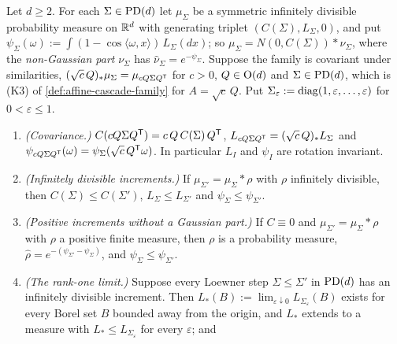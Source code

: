\begin{proposition}
\label{prop:similarity-general-sandwich}
\leanok
Let $d \ge 2$. For each $\Sigma \in \mathrm{PD}(d)$ let $\mu_\Sigma$ be a symmetric infinitely divisible
probability measure on $\mathbb{R}^d$ with generating triplet $(C(\Sigma), L_\Sigma, 0)$, and put
$\psi_\Sigma(\omega) := \int(1 - \cos\langle\omega,x\rangle)\,L_\Sigma(dx)$; so
$\mu_\Sigma = N(0,C(\Sigma)) * \nu_\Sigma$, where the \emph{non-Gaussian part} $\nu_\Sigma$ has
$\widehat\nu_\Sigma = e^{-\psi_\Sigma}$. Suppose the family is covariant under similarities,
$(\sqrt c\,Q)_*\mu_\Sigma = \mu_{cQ\Sigma Q^{\mathsf{T}}}$ for $c > 0$, $Q \in \mathrm{O}(d)$ and
$\Sigma \in \mathrm{PD}(d)$, which is (K3) of \ref{def:affine-cascade-family} for $A = \sqrt c\,Q$. Put
$\Sigma_\varepsilon := \operatorname{diag}(1,\varepsilon,\dots,\varepsilon)$ for $0 < \varepsilon \le 1$.
\begin{enumerate}
\item \emph{(Covariance.)} $C(cQ\Sigma Q^{\mathsf{T}}) = c\,Q\,C(\Sigma)\,Q^{\mathsf{T}}$,
$L_{cQ\Sigma Q^{\mathsf{T}}} = (\sqrt c\,Q)_*L_\Sigma$ and
$\psi_{cQ\Sigma Q^{\mathsf{T}}}(\omega) = \psi_\Sigma(\sqrt c\,Q^{\mathsf{T}}\omega)$. In particular $L_I$ and
$\psi_I$ are rotation invariant.
\item \emph{(Infinitely divisible increments.)} If $\mu_{\Sigma'} = \mu_\Sigma * \rho$ with $\rho$
infinitely divisible, then $C(\Sigma) \le C(\Sigma')$, $L_\Sigma \le L_{\Sigma'}$ and
$\psi_\Sigma \le \psi_{\Sigma'}$.
\item \emph{(Positive increments without a Gaussian part.)} If $C \equiv 0$ and
$\mu_{\Sigma'} = \mu_\Sigma * \rho$ with $\rho$ a positive finite measure, then $\rho$ is a
probability measure, $\widehat\rho = e^{-(\psi_{\Sigma'} - \psi_\Sigma)}$, and
$\psi_\Sigma \le \psi_{\Sigma'}$.
\item \emph{(The rank-one limit.)} Suppose every Loewner step $\Sigma \le \Sigma'$ in $\mathrm{PD}(d)$ has an
infinitely divisible increment. Then $L_*(B) := \lim_{\varepsilon\downarrow0}L_{\Sigma_\varepsilon}(B)$
exists for every Borel set $B$ bounded away from the origin, and $L_*$ extends to a \Levy{} measure
with $L_* \le L_{\Sigma_\varepsilon}$ for every $\varepsilon$; and

\end{enumerate}
\end{proposition}
